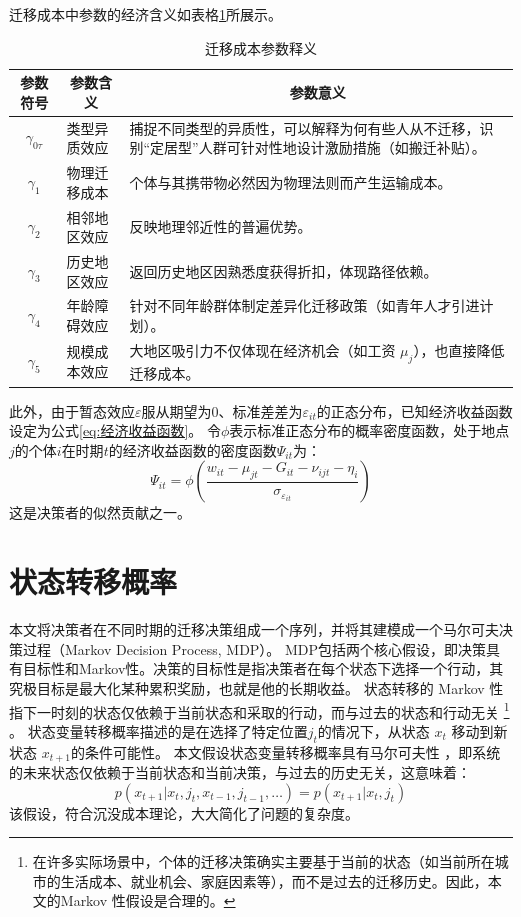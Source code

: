 \documentclass[
  a4paper,
  zihao=-4,
  fontset=mac,
  AutoFakeBold,
  AutoFakeSlant,
  oneside]{ctexbook}
\let\oldfootnote\footnote
\renewcommand{\footnote}[1]{%
  \oldfootnote{\setstretch{1.5}#1}%
}
\begin{document}
迁移成本中参数的经济含义如表格\ref{tab:迁移成本参数释义}所展示。
\begin{table}[!ht]
  \centering
  \caption{迁移成本参数释义}
  \label{tab:迁移成本参数释义}
  \begin{tabularx}{\textwidth}{@{}llX@{}}
    \toprule
    \multicolumn{1}{c}{\textbf{参数符号}} & \multicolumn{1}{c}{\textbf{参数含义}} & \multicolumn{1}{c}{\textbf{参数意义}} \\ \midrule
    \multicolumn{1}{c}{$\gamma_{0\tau}$} & 类型异质效应 & 捕捉不同类型的异质性，可以解释为何有些人从不迁移，识别“定居型”人群可针对性地设计激励措施（如搬迁补贴）。\\ 
    \multicolumn{1}{c}{$\gamma_1$} & 物理迁移成本 & 个体与其携带物必然因为物理法则而产生运输成本。 \\ 
    \multicolumn{1}{c}{$\gamma_2$} & 相邻地区效应 & 反映地理邻近性的普遍优势。 \\ 
    \multicolumn{1}{c}{$\gamma_3$} & 历史地区效应 & 返回历史地区因熟悉度获得折扣，体现路径依赖。 \\ 
    \multicolumn{1}{c}{$\gamma_4$} & 年龄障碍效应 & 针对不同年龄群体制定差异化迁移政策（如青年人才引进计划）。\\ 
    \multicolumn{1}{c}{$\gamma_5$} & 规模成本效应 & 大地区吸引力不仅体现在经济机会（如工资 $\mu_j$），也直接降低迁移成本。\\ \bottomrule
  \end{tabularx}
\end{table}


此外，由于暂态效应$\varepsilon$服从期望为0、标准差差为\(\varepsilon_{it}\)的正态分布，已知经济收益函数设定为公式\ref{eq:经济收益函数}。
令$\phi$表示标准正态分布的概率密度函数，处于地点$j$的个体$i$在时期$t$的经济收益函数的密度函数$\Psi_{it}$为：
\begin{equation}
  \Psi_{it}=\phi(\frac{w_{it} - \mu_{jt} - G_{it} - \nu_{ijt} - \eta_i }{\sigma_{\varepsilon_{it}}})
  \label{eq:经济收益似然贡献}
\end{equation}
这是决策者的似然贡献之一。

\section{状态转移概率}

本文将决策者在不同时期的迁移决策组成一个序列，并将其建模成一个马尔可夫决策过程（Markov Decision Process, MDP）。
MDP包括两个核心假设，即决策具有目标性和Markov性。决策的目标性是指决策者在每个状态下选择一个行动，其究极目标是最大化某种累积奖励，也就是他的长期收益。
状态转移的 Markov 性 指下一时刻的状态仅依赖于当前状态和采取的行动，而与过去的状态和行动无关
\footnote{在许多实际场景中，个体的迁移决策确实主要基于当前的状态（如当前所在城市的生活成本、就业机会、家庭因素等），而不是过去的迁移历史。因此，本文的Markov 性假设是合理的。}。
状态变量转移概率描述的是在选择了特定位置$j_{t}$的情况下，从状态 $x_t$ 移动到新状态 $x_{t+1}$的条件可能性。
本文假设状态变量转移概率具有马尔可夫性
，即系统的未来状态仅依赖于当前状态和当前决策，与过去的历史无关，这意味着：
\begin{equation}
  p(x_{t+1}|x_{t},j_{t},x_{t-1},j_{t-1},\ldots)=p(x_{t+1}|x_{t},j_{t})
\end{equation}
该假设，符合沉没成本理论，大大简化了问题的复杂度。
\end{document}
